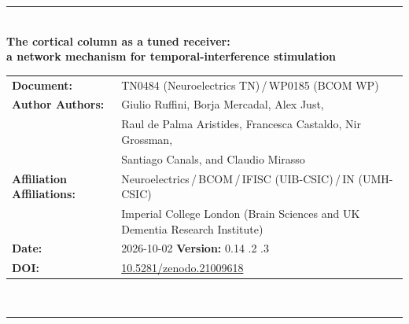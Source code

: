 \documentclass[11pt,a4paper]{article}
\newif\ifsupp
\providecommand{\DIFaddtex}[1]{{\protect\color{blue} \sf #1}} %
\providecommand{\DIFdeltex}[1]{{\protect\color{red} \scriptsize #1}} %
\providecommand{\DIFaddbegin}{} %
\providecommand{\DIFaddend}{} %
\providecommand{\DIFdelbegin}{} %
\providecommand{\DIFdelend}{} %
\providecommand{\DIFadd}[1]{\texorpdfstring{\DIFaddtex{#1}}{#1}} %
\providecommand{\DIFdel}[1]{\texorpdfstring{\DIFdeltex{#1}}{}} %
\begin{document}
\vspace{6pt}
\else
\begin{flushleft}
{\color{neblue}\rule{\textwidth}{2pt}}\\[4pt]
{\LARGE\bfseries The cortical column as a tuned receiver:\\[2pt]
a network mechanism for temporal-interference stimulation}\\[10pt]
\begin{tabular}{@{}lp{}@{}}
\textbf{Document:} & TN0484 (Neuroelectrics TN)\,/\,WP0185 (BCOM WP) \\
\textbf{\DIFdelbegin \DIFdel{Author}\DIFdelend \DIFaddbegin \DIFadd{Authors}\DIFaddend :} & Giulio Ruffini, Borja Mercadal, Alex Just,\DIFaddbegin \\
& \DIFaddend Raul de Palma Aristides, \DIFdelbegin %
\DIFdelend Francesca Castaldo, \DIFaddbegin \DIFadd{Nir Grossman,}\\
& \DIFaddend Santiago Canals, and Claudio Mirasso \\
\textbf{\DIFdelbegin \DIFdel{Affiliation}\DIFdelend \DIFaddbegin \DIFadd{Affiliations}\DIFaddend :} & Neuroelectrics\,/\,BCOM\,/\,IFISC (UIB-CSIC)\,/\,IN (UMH-CSIC)\\
\DIFaddbegin & \DIFadd{Imperial College London (Brain Sciences and UK Dementia Research Institute) }\\
\DIFaddend \textbf{Date:} & 2026-10-02 \qquad \textbf{Version:} 0.14\DIFdelbegin \DIFdel{.2 }\DIFdelend \DIFaddbegin \DIFadd{.3 }\DIFaddend \\
\textbf{DOI:} & \href{https://doi.org/10.5281/zenodo.21009618}{10.5281/zenodo.21009618} \\
\end{tabular}\\[4pt]
{\color{neblue}\rule{\textwidth}{1pt}}
\end{flushleft}
\fi

\ifsupp
\begin{center}
{\large\bfseries Supplementary Material}\\[4pt]
\begin{minipage}{0.86\textwidth}\centering\small
Appendices and supplementary figures accompanying the article. Section, equation and
figure numbers referenced here follow the main text; supplementary figures are numbered
S1, S2, \dots
\end{minipage}
\end{center}
\vspace{8pt}
\fi
\end{document}

